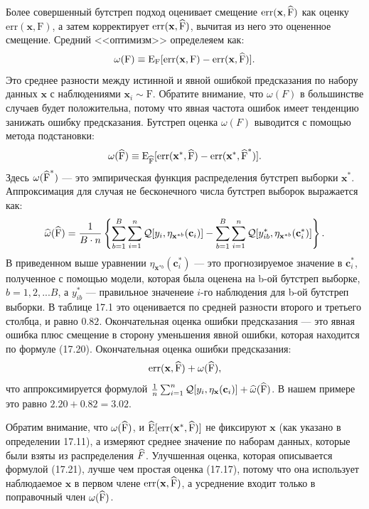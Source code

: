 Более совершенный бутстреп подход оценивает смещение $ \text{err}(\textbf{x}, \widehat{\text{F}})$ как оценку $ \text{err}(\textbf{x}, \text{F})$, а затем корректирует $ \text{err}(\textbf{x}, \widehat{\text{F}})$, вычитая из него это оцененное смещение. Средний <<оптимизм>> определеяем как:
\begin{equation}
\omega(\text{F}) \equiv \mathrm{E}_{\text{F}}[\text{err}(\textbf{x}, \text{F}) - \text{err}(\textbf{x}, \widehat{\text{F}})].
\end{equation}
Это среднее разности между истинной и явной ошибкой предсказания по набору данных $\textbf{x}$ с наблюдениями $\textbf{x}_{i} \sim \text{F}$. Обратите внимание, что $\omega(F)$ в большинстве случаев будет положительна, потому что явная частота ошибок имеет тенденцию занижать ошибку предсказания. Бутстреп оценка $\omega(F)$ выводится с помощью метода подстановки:
\begin{equation}
\omega(\widehat{\text{F}}) \equiv \mathrm{E}_{\widehat{\text{F}}}[\text{err}(\textbf{x}^{*}, \widehat{\text{F}}) - \text{err}(\textbf{x}^{*}, \widehat{\text{F}}^{*})].
\end{equation}
Здесь $\omega(\widehat{\text{F}}^{*})$ --- это эмпирическая  функция распределения бутстреп выборки $\textbf{x}^{*}$. Аппроксимация для случая не бесконечного числа бутстреп выборок выражается как:
\begin{equation}
\widehat{\omega}(\widehat{\text{F}}) = \frac{1}{B\cdot n}\left \{ \sum_{b = 1}^{B} \sum_{i = 1}^{n} \mathcal{Q}[y_{i},  \eta_{\textbf{x}^{*b}}(\textbf{c}_{i})] - \sum_{b = 1}^{B} \sum_{i = 1}^{n} \mathcal{Q}[y^{*}_{ib},  \eta_{\textbf{x}^{*b}}(\textbf{c}^{*}_{i})] \right \}.
\end{equation}
В приведенном выше уравнении $\eta_{\textbf{x}^{*b}}(\textbf{c}^{*}_{i})$ --- это прогнозируемое значение в $\textbf{c}^{*}_{i}$, полученное с помощью модели, которая была оценена на b-ой бутстреп выборке, $b = 1, 2, ... B$, а $y^{*}_{ib}$ --- правильное значенеие $i$-го наблюдения для b-ой бутстреп выборки. В таблице 17.1 это оценивается по средней разности второго и третьего столбца, и равно $0.82$. Окончательная оценка ошибки предсказания --- это явная ошибка плюс смещение в сторону уменьшения явной ошибки, которая находится по формуле (17.20). Окончательная оценка ошибки предсказания:
\begin{equation}
\text{err}(\textbf{x}, \widehat{\text{F}}) + \omega(\widehat{\text{F}}),
\end{equation}
что аппроксимируется формулой $ \frac{1}{n} \sum_{i = 1}^{n} \mathcal{Q}[y_{i}, \eta_{\textbf{x}}(\textbf{c}_{i})] + \widehat{\omega}(\widehat{\text{F}})$. В нашем примере это равно $2.20 + 0.82 = 3.02$.

Обратим внимание, что $\omega(\widehat{\text{F}})$, и $\widehat{\mathrm{E}}[\text{err}(\textbf{x}^{*}, \widehat{\text{F}})]$ не фиксируют $\textbf{x}$ (как указано в определении 17.11), а измеряют среднее значение по наборам данных, которые были взяты из распределения $\widehat{F}$. Улучшенная оценка, которая описывается формулой (17.21), лучше чем простая оценка (17.17), потому что она использует наблюдаемое $\textbf{x}$ в первом члене $\text{err}(\textbf{x}, \widehat{\text{F}})$, а усреднение входит только в поправочный член $\omega(\widehat{\text{F}})$.